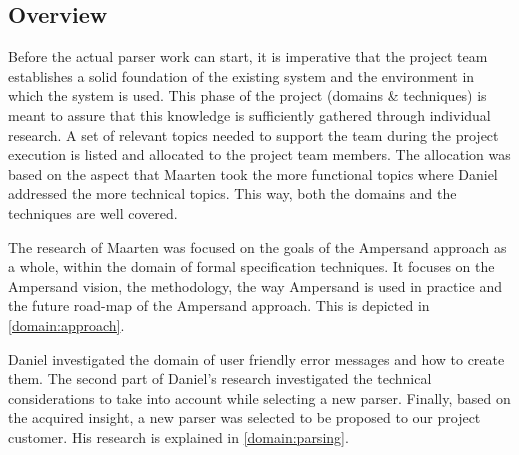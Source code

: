 
\subsection{Overview}
\label{domain:overview}
Before the actual parser work can start, it is imperative that the project team establishes a solid foundation of the existing system and the environment in which the system is used.
This phase of the project (domains \& techniques) is meant to assure that this knowledge is sufficiently gathered through individual research.
A set of relevant topics needed to support the team during the project execution is listed and allocated to the project team members.
The allocation was based on the aspect that Maarten took the more functional topics where Daniel addressed the more technical topics.
This way, both the domains and the techniques are well covered.

The research of Maarten was focused on the goals of the Ampersand approach as a whole, within the domain of formal specification techniques.
It focuses on the Ampersand vision, the methodology, the way Ampersand is used in practice and the future road-map of the Ampersand approach.
This is depicted in \autoref{domain:approach}.

Daniel investigated the domain of user friendly error messages and how to create them.
The second part of Daniel's research investigated the technical considerations to take into account while selecting a new parser.
Finally, based on the acquired insight, a new parser was selected to be proposed to our project customer.
His research is explained in \autoref{domain:parsing}.
